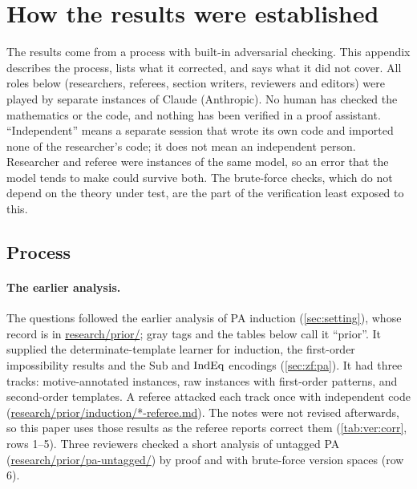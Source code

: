 \section{How the results were established}\label{app:ver}

The results come from a process with built-in adversarial checking. This appendix describes the process, lists what it
corrected, and says what it did not cover. All roles below (researchers, referees, section writers, reviewers and
editors) were played by separate instances of Claude (Anthropic). No human has checked the mathematics or the code, and nothing has been verified
in a proof assistant. ``Independent'' means a separate session that wrote its own code and imported none of the researcher's
code; it does not mean an independent person. Researcher and referee were instances of the same model, so an error that the
model tends to make could survive both. The brute-force checks, which do not depend on the theory under test, are the
part of the verification least exposed to this.

\subsection{Process}\label{app:ver:process}

\paragraph{The earlier analysis.} The questions followed the earlier analysis of PA induction (\cref{sec:setting}),
whose record is in \url{research/prior/}; gray tags and the tables below call it ``prior''. It supplied the
determinate-template learner for induction, the first-order impossibility results and the Sub and $\mathrm{IndEq}$ encodings
(\cref{sec:zf:pa}). It had three tracks: motive-annotated instances, raw instances with first-order patterns, and
second-order templates. A referee attacked each track once with independent code
(\url{research/prior/induction/*-referee.md}). The notes were not revised afterwards, so this paper uses those
results as the referee reports correct them (\cref{tab:ver:corr}, rows 1--5). Three reviewers checked a short analysis
of untagged PA (\url{research/prior/pa-untagged/}) by proof and with brute-force version spaces (row 6).

